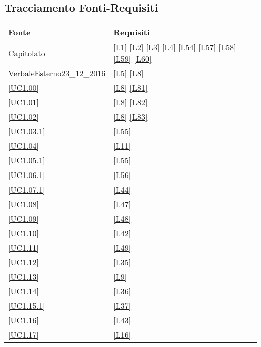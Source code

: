 \subsection{Tracciamento Fonti-Requisiti}

\begin{longtable}{|P{6cm}|P{6cm}|}
	\hline \textbf{Fonte} & \textbf{Requisiti}\\
	\hline Capitolato & \ref{L1} \linebreak \ref{L2} \linebreak \ref{L3} \linebreak \ref{L4} \linebreak \ref{L54} \linebreak \ref{L57} \linebreak \ref{L58} \linebreak \ref{L59} \linebreak \ref{L60}\\
	\hline VerbaleEsterno23\_12\_2016 & \ref{L5} \linebreak \ref{L8} \\
	\hline \ref{UC1.00} & \ref{L8} \linebreak \ref{L81} \\
	\hline \ref{UC1.01} & \ref{L8} \linebreak \ref{L82} \\
	\hline \ref{UC1.02} & \ref{L8} \linebreak \ref{L83} \\
	\hline \ref{UC1.03.1} & \ref{L55} \\
	\hline \ref{UC1.04} & \ref{L11} \\
	\hline \ref{UC1.05.1} & \ref{L55} \\
	\hline \ref{UC1.06.1} & \ref{L56} \\
	\hline \ref{UC1.07.1} & \ref{L44} \\
	\hline \ref{UC1.08} & \ref{L47} \\
	\hline \ref{UC1.09} & \ref{L48} \\
	\hline \ref{UC1.10} & \ref{L42} \\
	\hline \ref{UC1.11} & \ref{L49} \\	
	\hline \ref{UC1.12} & \ref{L35} \\
	\hline \ref{UC1.13} & \ref{L9} \\	
	\hline \ref{UC1.14} & \ref{L36} \\
	\hline \ref{UC1.15.1} & \ref{L37} \\
	\hline \ref{UC1.16} & \ref{L43} \\
	\hline \ref{UC1.17} & \ref{L16} \\

\end{longtable}
